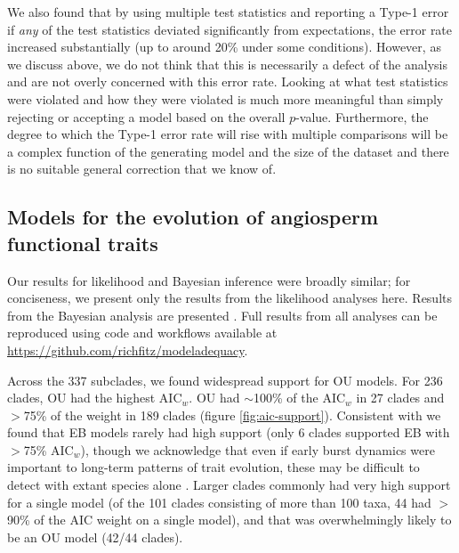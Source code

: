 We also found that by using multiple test statistics and reporting a Type-1 error if \emph{any} of the test statistics deviated significantly from expectations, the error rate increased substantially (up to around 20\% under some conditions). However, as we discuss above, we do not think that this is necessarily a defect of the analysis and are not overly concerned with this error rate. Looking at what test statistics were violated and how they were violated is much more meaningful than simply rejecting or accepting a model based on the overall $p$-value. Furthermore, the degree to which the Type-1 error rate will rise with multiple comparisons will be a complex function of the generating model and the size of the dataset and there is no suitable general correction that we know of.

\subsection{Models for the evolution of angiosperm functional traits}

Our results for likelihood and Bayesian inference were broadly similar; for conciseness, we present only the results from the likelihood analyses here. Results from the Bayesian analysis are presented . Full results from all analyses can be reproduced using code and workflows available at \url{https://github.com/richfitz/modeladequacy}. 

Across the 337 subclades, we found widespread support for OU
models. For 236 clades, OU had the highest AIC$_w$.
OU had $\sim$100\% of the AIC$_w$ in 27 clades and $>$75\% of the weight in 189 clades (figure \ref{fig:aic-support}). Consistent with \citet{Harmon2010} we found that EB models rarely had high support (only 6 clades supported EB with $>$75\% AIC$_w$), though we acknowledge that even if early burst dynamics were important to long-term patterns of trait evolution, these may be difficult to detect with extant species alone \citep{Slater2012Fossil, SlaterPennell}. Larger clades commonly had
very high support for a single model (of the 101 clades consisting of more than 100 taxa, 44 had $>$90\% of the AIC weight on a single model),
and that was overwhelmingly likely to be an OU model (42/44 clades). 

